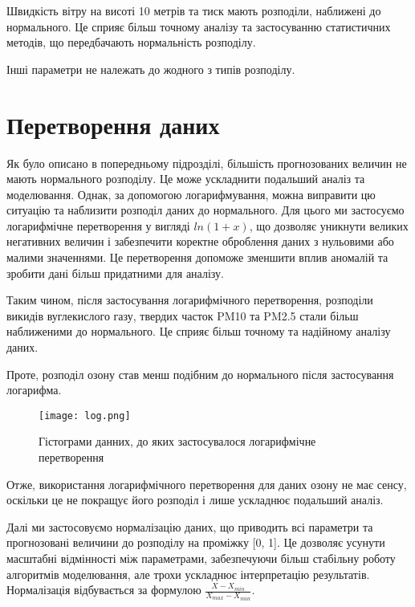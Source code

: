 Швидкість вітру на висоті 10 метрів та тиск мають розподіли, наближені до нормального. 
Це сприяє більш точному аналізу та застосуванню статистичних методів, що передбачають нормальність розподілу.

Інші параметри не належать до жодного з типів розподілу.

\section{Перетворення даних}

Як було описано в попередньому підрозділі, більшість прогнозованих величин не мають нормального розподілу. 
Це може ускладнити подальший аналіз та моделювання. 
Однак, за допомогою логарифмування, можна виправити цю ситуацію та наблизити розподіл даних до нормального.
Для цього ми застосуємо логарифмічне перетворення у вигляді $ln(1 + x)$, що дозволяє уникнути великих негативних величин і забезпечити коректне оброблення даних з нульовими або малими значеннями. 
Це перетворення допоможе зменшити вплив аномалій та зробити дані більш придатними для аналізу.

Таким чином, після застосування логарифмічного перетворення, розподіли викидів вуглекислого газу, твердих часток PM10 та PM2.5 стали більш наближеними до нормального. Це сприяє більш точному та надійному аналізу даних.

Проте, розподіл озону став менш подібним до нормального після застосування логарифма. 

\begin{figure}[H]
    \begin{center}
        \texttt{[image: log.png]}
        \caption{Гістограми данних, до яких застосувалося логарифмічне перетворення}
    \end{center}
\end{figure}


Отже, використання логарифмічного перетворення для даних озону не має сенсу, оскільки це не покращує його розподіл і лише ускладнює подальший аналіз.

Далі ми застосовуємо нормалізацію даних, що приводить всі параметри та прогнозовані величини до розподілу на проміжку [0, 1]. 
Це дозволяє усунути масштабні відмінності між параметрами, забезпечуючи більш стабільну роботу алгоритмів моделювання, але трохи ускладнює інтерпретацію результатів.
Нормалізація відбувається за формулою $\frac{X- X_{min}}{X_{max} - X_{min}}$.
